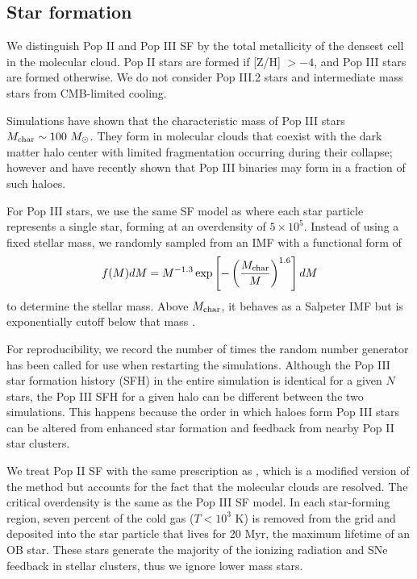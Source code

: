 \documentclass[useAMS,usenatbib]{mn2e}
\begin{document}
\subsection{Star formation}

We distinguish Pop II and Pop III SF by the total metallicity of the
densest cell in the molecular cloud.  Pop II stars are formed if [Z/H]
$> -4$, and Pop III stars are formed otherwise.  We do not consider
Pop III.2 stars and intermediate mass stars from CMB-limited cooling.

Simulations have shown that the characteristic mass of Pop III stars
$M_{\rm char} \sim 100~\Ms$.  They form in molecular clouds that
coexist with the dark matter halo center with limited fragmentation
occurring during their collapse; however \citet{2009Sci...325..601T}
and \citet{Stacy10_Binary} have recently shown that Pop III binaries
may form in a fraction of such haloes.


For Pop III stars, we use the same SF model as \citet{Wise08_Gal} where
each star particle represents a single star, forming at an overdensity
of $5 \times 10^5$.  Instead of using a fixed stellar mass, we randomly
sampled from an IMF with a functional form of
%
\begin{equation}
\label{eqn:imf}
f(M)dM = M^{-1.3} \exp\left[-\left(\frac{M_{\rm
        char}}{M}\right)^{1.6}\right] dM
\end{equation}
to determine the stellar mass.  Above $M_{\rm char}$, it behaves as a
Salpeter IMF but is exponentially cutoff below that mass
\citep{Chabrier03, Clark09}.

For reproducibility, we record the number of times the random number
generator \citep[Mersenne twister;][]{MTwister} has been called for use
when restarting the simulations.  Although the Pop III star formation
history (SFH) in the entire simulation is identical for a given $N$
stars, the Pop III SFH for a given halo can be different between the
two simulations.  This happens because the order in which haloes form
Pop III stars can be altered from enhanced star formation and feedback
from nearby Pop II star clusters.

We treat Pop II SF with the same prescription as \citet{Wise09}, which
is a modified version of the \citet{Cen92} method but accounts for the
fact that the molecular clouds are resolved.  The critical overdensity
is the same as the Pop III SF model.  In each star-forming region,
seven percent of the cold gas ($T < 10^3$ K) is removed from the grid
and deposited into the star particle that lives for 20 Myr, the
maximum lifetime of an OB star.  These stars generate the majority of
the ionizing radiation and SNe feedback in stellar clusters, thus we
ignore lower mass stars.
\end{document}
